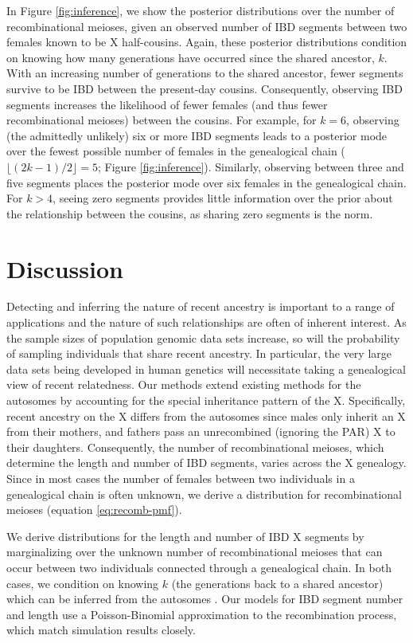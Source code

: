 \documentclass[11pt]{article}
\begin{document}
In Figure \ref{fig:inference}, we show the posterior distributions over the
number of recombinational meioses, given an observed number of IBD segments
between two females known to be X half-cousins. Again, these posterior
distributions condition on knowing how many generations have occurred since the
shared ancestor, $k$.  With an increasing number of generations to the shared
ancestor, fewer segments survive to be IBD between the present-day cousins.
Consequently, observing IBD segments increases the likelihood of fewer females
(and thus fewer recombinational meioses) between the cousins. For example, for
$k=6$, observing (the admittedly unlikely) six or more IBD segments leads to a
posterior mode over the fewest possible number of females in the genealogical
chain ($\lfloor (2k-1)/2 \rfloor = 5$; Figure \ref{fig:inference}).  Similarly,
observing between three and five segments places the posterior mode over six
females in the genealogical chain. For $k>4$, seeing zero segments provides
little information over the prior about the relationship between the cousins,
as sharing zero segments is the norm.


\section{Discussion}

Detecting and inferring the nature of recent ancestry is important to a range
of applications and the nature of such relationships are often of inherent
interest.  As the sample sizes of population genomic data sets increase, so
will the probability of sampling individuals that share recent ancestry. In
particular, the very large data sets being developed in human genetics will
necessitate taking a genealogical view of recent relatedness.  Our methods
extend existing methods for the autosomes by accounting for the special
inheritance pattern of the X. Specifically, recent ancestry on the X differs
from the autosomes since males only inherit an X from their mothers, and
fathers pass an unrecombined (ignoring the PAR) X to their daughters.
Consequently, the number of recombinational meioses, which determine the length
and number of IBD segments, varies across the X genealogy. Since in most cases
the number of females between two individuals in a genealogical chain is often
unknown, we derive a distribution for recombinational meioses (equation
\eqref{eq:recomb-pmf}).

We derive distributions for the length and number of IBD X segments by
marginalizing over the unknown number of recombinational meioses that can occur
between two individuals connected through a genealogical chain. In both cases,
we condition on knowing $k$ (the generations back to a shared ancestor) which
can be inferred from the autosomes \citep{huff2011maximum}. Our models for IBD
segment number and length use a Poisson-Binomial approximation to the
recombination process, which match simulation results closely.
\end{document}

